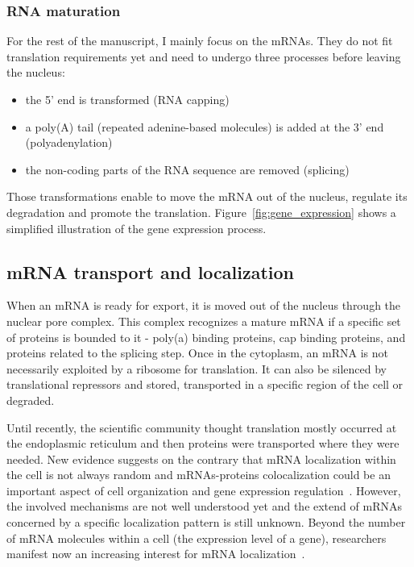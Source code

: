 \subsubsection{RNA maturation}

For the rest of the manuscript, I mainly focus on the \ac{mRNA}s.
They do not fit translation requirements yet and need to undergo three processes before leaving the nucleus:
\begin{itemize}
	\setlength\itemsep{0.1em}
	\item the 5' end is transformed (\ac{RNA} capping)
	\item a poly(A) tail (repeated adenine-based molecules) is added at the 3' end (polyadenylation)
	\item the non-coding parts of the \ac{RNA} sequence are removed (splicing)
\end{itemize}

\noindent
Those transformations enable to move the \ac{mRNA} out of the nucleus, regulate its degradation and promote the translation.
Figure~\ref{fig:gene_expression} shows a simplified illustration of the gene expression process.

\subsection{mRNA transport and localization}
\label{subsec:intro_rna_transport}

When an \ac{mRNA} is ready for export, it is moved out of the nucleus through the nuclear pore complex.
This complex recognizes a mature \ac{mRNA} if a specific set of proteins is bounded to it - poly(a) binding proteins, cap binding proteins, and proteins related to the splicing step.
Once in the cytoplasm, an \ac{mRNA} is not necessarily exploited by a ribosome for translation.
It can also be silenced by translational repressors and stored, transported in a specific region of the cell or degraded.

Until recently, the scientific community thought translation mostly occurred at the endoplasmic reticulum and then proteins were transported where they were needed.
New evidence suggests on the contrary that \ac{mRNA} localization within the cell is not always random and \ac{mRNA}s-proteins colocalization could be an important aspect of cell organization and gene expression regulation~\cite{lecuyer_global_2007}.
However, the involved mechanisms are not well understood yet and the extend of \ac{mRNA}s concerned by a specific localization pattern is still unknown.
Beyond the number of \ac{mRNA} molecules within a cell (the expression level of a gene), researchers manifest now an increasing interest for \ac{mRNA} localization~\cite{Chin_lecuyer_2017}.

